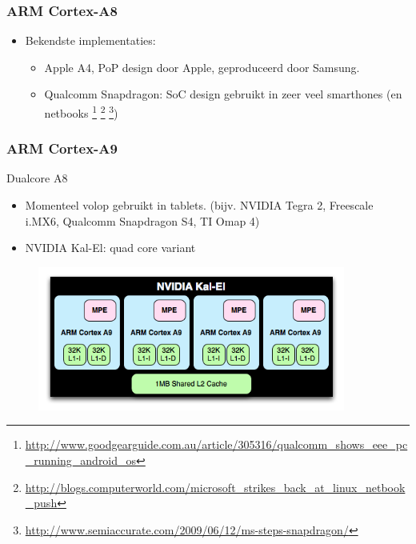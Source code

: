 \documentclass{beamer}
\begin{document}
\begin{frame} 
\frametitle{ARM Cortex-A8}
    \begin{itemize}
      \item <1-> Bekendste implementaties:
      \begin{itemize}
	  \item Apple A4, PoP design door Apple, geproduceerd door Samsung.
	  \item Qualcomm Snapdragon: SoC design gebruikt in zeer veel smarthones (en netbooks
		  \footnote{\url{http://www.goodgearguide.com.au/article/305316/qualcomm_shows_eee_pc_running_android_os}}
 		  \footnote{\url{http://blogs.computerworld.com/microsoft_strikes_back_at_linux_netbook_push}}
		  \footnote{\url{http://www.semiaccurate.com/2009/06/12/ms-steps-snapdragon/}})
      \end{itemize}
  \end{itemize}
\end{frame}


\begin{frame} 
\frametitle{ARM Cortex-A9}
Dualcore A8

\begin{itemize}
    \item Momenteel volop gebruikt in tablets. (bijv. NVIDIA Tegra 2, Freescale i.MX6, Qualcomm Snapdragon S4, TI Omap 4)
    \item NVIDIA Kal-El: quad core variant
\end{itemize}

\begin{figure}[h] \begin{center}
\includegraphics[width=0.9\textwidth]{figures/kalelcpu.png}
\end{center} \end{figure}

\end{frame}

\end{document}
